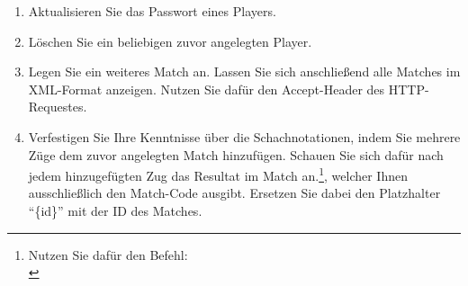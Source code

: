 \begin{enumerate}
	\item Aktualisieren Sie das Passwort eines Players.
	\item Löschen Sie ein beliebigen zuvor angelegten Player.
	\item Legen Sie ein weiteres Match an. Lassen Sie sich anschließend alle Matches im \gls{XML}-Format anzeigen. Nutzen Sie dafür den Accept-Header des \gls{HTTP}-Requestes.
	\item Verfestigen Sie Ihre Kenntnisse über die Schachnotationen, indem Sie mehrere Züge dem zuvor angelegten Match hinzufügen. Schauen Sie sich dafür nach jedem hinzugefügten Zug das Resultat im Match an.\footnote{Nutzen Sie dafür den Befehl:\\}, welcher Ihnen ausschließlich den Match-Code ausgibt. Ersetzen Sie dabei den Platzhalter \enquote{\{id\}} mit der ID des Matches.
\end{enumerate}